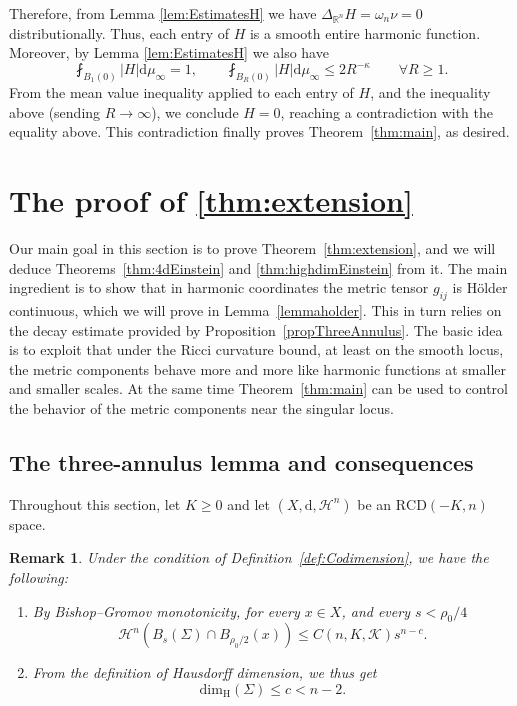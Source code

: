 \documentclass[12pt,a4paper,reqno]{amsart}
\newtheorem{remark}[theorem]{Remark}
\renewcommand{\leq}{\leqslant}
\renewcommand{\geq}{\geqslant}
\begin{document}
Therefore, from Lemma \ref{lem:EstimatesH} we have $\Delta_{\mathbb R^n}H=\omega_n\nu=0$ distributionally. Thus, each entry of $H$ is
a smooth entire harmonic function. Moreover, by Lemma \ref{lem:EstimatesH} we also have
\begin{equation}
 \fint_{B_1(0)}|H|\mathrm{d}\mu_\infty=1,
 \qquad
 \fint_{B_R(0)}|H|\mathrm{d}\mu_\infty\leq 2R^{-\kappa}\qquad \forall R\geq1.
 \label{eq:H-growth-final}
\end{equation}
From the mean value inequality applied to each entry of $H$, and the inequality above (sending $R\to \infty$), we conclude $H=0$, reaching a contradiction with the equality above. This contradiction finally proves Theorem~\ref{thm:main}, as desired.
 

\section{The proof of \texorpdfstring{\cref{thm:extension}}{Theorem 1.5}}
Our main goal in this section is to prove Theorem~\ref{thm:extension}, and we will deduce Theorems~\ref{thm:4dEinstein} and \ref{thm:highdimEinstein} from it. The main ingredient is to show that in harmonic coordinates the metric tensor $g_{ij}$ is H\"older continuous, which we will prove in Lemma~\ref{lemmaholder}. This in turn relies on the decay estimate provided by Proposition~\ref{propThreeAnnulus}. The basic idea is to exploit that under the Ricci curvature bound, at least on the smooth locus, the metric components behave more and more like harmonic functions at smaller and smaller scales. At the same time Theorem~\ref{thm:main} can be used to control the behavior of the metric components near the singular locus.

\subsection{The three-annulus lemma and consequences}
Throughout this section, let $K\geq 0$ and let $(X,\mathrm{d},\mathcal{H}^n)$ be an $\mathrm{RCD}(-K,n)$ space.

\begin{remark}\label{remHausDim}
    Under the condition of Definition~\ref{def:Codimension}, we have the following:
    \begin{enumerate}
        \item By Bishop--Gromov monotonicity, for every $x\in X$, and every $s<\rho_0/4$
        \[
        \mathcal{H}^n(B_s(\Sigma)\cap B_{\rho_0/2}(x))\leq C(n,K,\mathcal{K}) s^{n-c}.
        \]
        \item From the definition of Hausdorff dimension,  we thus get
        \[
        \mathrm{dim}_{\mathrm{H}}(\Sigma) \leq c < n-2.
        \]
    \end{enumerate}
\end{remark}
\end{document}
